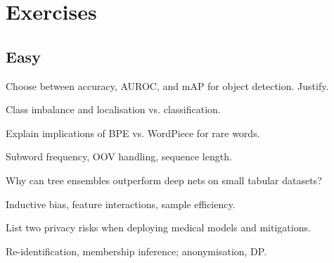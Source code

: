 
\section*{Exercises}

\subsection*{Easy}

\begin{exercisebox}[easy]
\begin{problem}
Choose between accuracy, AUROC, and mAP for object detection. Justify.
\end{problem}
\begin{hintbox}
Class imbalance and localisation vs. classification.
\end{hintbox}
\end{exercisebox}


\begin{exercisebox}[easy]
\begin{problem}
Explain implications of BPE vs. WordPiece for rare words.
\end{problem}
\begin{hintbox}
Subword frequency, OOV handling, sequence length.
\end{hintbox}
\end{exercisebox}


\begin{exercisebox}[easy]
\begin{problem}
Why can tree ensembles outperform deep nets on small tabular datasets?
\end{problem}
\begin{hintbox}
Inductive bias, feature interactions, sample efficiency.
\end{hintbox}
\end{exercisebox}


\begin{exercisebox}[easy]
\begin{problem}
List two privacy risks when deploying medical models and mitigations.
\end{problem}
\begin{hintbox}
Re-identification, membership inference; anonymisation, DP.
\end{hintbox}
\end{exercisebox}


